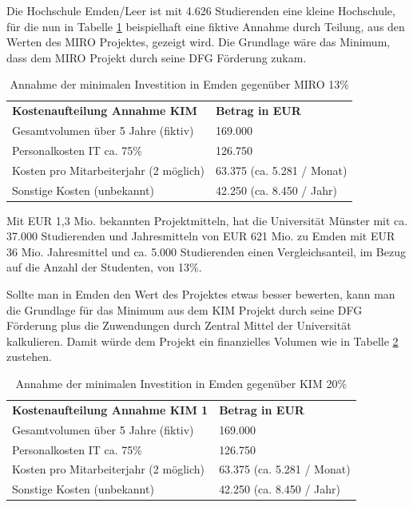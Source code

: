 Die Hochschule Emden/Leer ist mit 4.626 Studierenden eine kleine Hochschule, für die nun in Tabelle \ref{tab_kostenaufteilung_emden_MIRO} beispielhaft eine fiktive Annahme durch Teilung, aus den Werten des MIRO Projektes, gezeigt wird. Die Grundlage wäre das Minimum, dass dem MIRO Projekt durch seine DFG Förderung zukam.

\begin{table}[h!]
	\begin{tabularx}{\textwidth}{l|l}
		\hline
		\textbf{Kostenaufteilung Annahme KIM} & \textbf{Betrag in EUR}\\
		Gesamtvolumen über 5 Jahre (fiktiv) & 169.000\\
		Personalkosten IT ca. 75\% & 126.750\\
		Kosten pro Mitarbeiterjahr (2 möglich) & 63.375 (ca. 5.281 / Monat)\\ 
		Sonstige Kosten (unbekannt) & 42.250 (ca. 8.450 / Jahr)\\
		\hline
	\end{tabularx}
	\caption{Annahme der minimalen Investition in Emden gegenüber MIRO 13\%}
	\label{tab_kostenaufteilung_emden_MIRO}
\end{table}

\newpage

Mit EUR 1,3 Mio. bekannten Projektmitteln, hat die Universität Münster mit ca. 37.000 Studierenden und Jahresmitteln von EUR 621 Mio. zu Emden mit EUR 36 Mio. Jahresmittel und ca. 5.000 Studierenden einen Vergleichsanteil, im Bezug auf die Anzahl der Studenten, von 13\%.

Sollte man in Emden den Wert des Projektes etwas besser bewerten, kann man die Grundlage für das Minimum aus dem KIM Projekt durch seine DFG Förderung plus die Zuwendungen durch Zentral Mittel der Universität kalkulieren. Damit würde dem Projekt ein finanzielles Volumen wie in Tabelle \ref{tab_kostenaufteilung_emden_KIM1} zustehen.

\begin{table}[h!]
	\begin{tabularx}{\textwidth}{l|l}
		\hline
		\textbf{Kostenaufteilung Annahme KIM 1} & \textbf{Betrag in EUR}\\
		Gesamtvolumen über 5 Jahre (fiktiv) & 169.000\\
		Personalkosten IT ca. 75\% & 126.750\\
		Kosten pro Mitarbeiterjahr (2 möglich) & 63.375 (ca. 5.281 / Monat)\\ 
		Sonstige Kosten (unbekannt) & 42.250 (ca. 8.450 / Jahr)\\
		\hline
	\end{tabularx}
	\caption{Annahme der minimalen Investition in Emden gegenüber KIM 20\%}
	\label{tab_kostenaufteilung_emden_KIM1}
\end{table}

